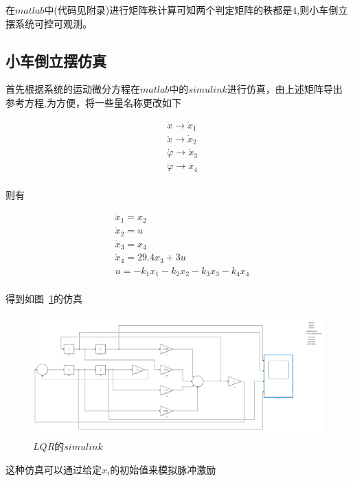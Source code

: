 在$matlab$中(代码见附录)进行矩阵秩计算可知两个判定矩阵的秩都是$4$,则小车倒立摆系统可控可观测。

\subsection{小车倒立摆仿真}

首先根据系统的运动微分方程在$matlab$中的$simulink$进行仿真，由上述矩阵导出参考方程,为方便，将一些量名称更改如下

\begin{equation}
\begin{aligned}
&\dot x\rightarrow \dot x_1\\
&\ddot x\rightarrow \dot x_2\\
&\dot \varphi \rightarrow \dot x_3\\
&\ddot \varphi \rightarrow \dot x_4\\
\end{aligned}
\end{equation}

则有

\begin{equation}
\begin{aligned}
&\dot x_1=x_2\\
&\dot x_2=u\\
&\dot x_3=x_4\\
&\dot x_4=29.4x_3+3u\\
&u=-k_1x_1-k_2x_2-k_3x_3-k_4x_4\\
\end{aligned}
\end{equation}

得到如图~\ref{LQR_simulink}的仿真

\begin{figure}[hbpt]
\centering
\includegraphics[width=16cm]{LQR_simulink.png}
\caption{$LQR的simulink$}\label{LQR_simulink}
\end{figure}

这种仿真可以通过给定$x_i$的初始值来模拟脉冲激励

